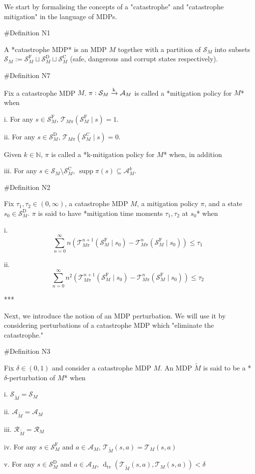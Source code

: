 \documentclass[a4paper]{article}
\DeclareMathOperator{\Supp}{supp}
\newcommand{\AP}[1]{\left(#1\right)}
\newcommand{\Dtva}[1]{\operatorname{d}_{\text{tv}}\AP{#1}}
\newcommand{\Nats}{\mathbb{N}}
\newcommand{\M}{\xrightarrow{\textnormal{k}}}
\newcommand{\A}{\mathcal{A}}
\newcommand{\St}{\mathcal{S}}
\newcommand{\T}{\mathcal{T}}
\newcommand{\R}{\mathcal{R}}
\newcommand{\RMC}{\mathrm{C}}
\newcommand{\RMD}{\mathrm{D}}
\newcommand{\RMF}{\mathrm{F}}
\newcommand{\SF}{\St^{\RMF}}
\newcommand{\SD}{\St^{\RMD}}
\newcommand{\SC}{\St^{\RMC}}
\begin{document}
We start by formalising the concepts of a "catastrophe" and "catastrophe mitigation" in the language of MDPs.

\#Definition N1

A *catastrophe MDP* is an MDP $M$ together with a partition of $\St_M$ into subsets $\St_M:=\SF_M \sqcup \SD_M \sqcup \SC_M$ (safe, dangerous and corrupt states respectively). 

\#Definition N7

Fix a catastrophe MDP $M$. $\pi: \St_M \M \A_M$ is called a *mitigation policy for $M$* when

i. For any $s \in \SF_M$, $\T_{M\pi}\AP{\SF_M \mid s}=1$.

ii. For any $s \in \SD_M$, $\T_{M\pi}\AP{\SC_M \mid s}=0$.

Given $k \in \Nats$, $\pi$ is called a *k-mitigation policy for $M$* when, in addition

iii. For any $s \in \St_M \setminus \SC_M$, $\Supp{\pi(s)} \subseteq \A_M^k$.


\#Definition N2

Fix $\tau_1,\tau_2 \in (0,\infty)$, a catastrophe MDP $M$, a mitigation policy $\pi$, and a state $s_0 \in \SD_M$. $\pi$ is said to have *mitigation time moments $\tau_1,\tau_2$ at $s_0$* when

i. $$\sum_{n=0}^\infty n \AP{\T_{M\pi}^{n+1}\AP{\SF_M \mid s_0}-\T_{M\pi}^{n}\AP{\SF_M \mid s_0}} \leq \tau_1$$

ii. $$\sum_{n=0}^\infty n^2 \AP{\T_{M\pi}^{n+1}\AP{\SF_M \mid s_0}-\T_{M\pi}^{n}\AP{\SF_M \mid s_0}} \leq \tau_2$$

***

Next, we introduce the notion of an MDP perturbation. We will use it by considering perturbations of a catastrophe MDP which "eliminate the catastrophe."

\#Definition N3

Fix $\delta\in(0,1)$ and consider a catastrophe MDP $M$. An MDP $\tilde{M}$ is said to be a *$\delta$-perturbation of $M$* when

i. $\St_{\tilde{M}} = \St_M$

ii. $\A_{\tilde{M}} = \A_M$

iii. $\R_{\tilde{M}}=\R_M$

iv. For any $s \in \SF_M$ and $a \in \A_M$, $\T_{\tilde{M}}\AP{s,a}=\T_{M}\AP{s,a}$

v. For any $s \in \SD_M$ and $a \in \A_M$, $\Dtva{\T_{\tilde{M}}\AP{s,a},\T_{M}\AP{s,a}} < \delta$
\end{document}
